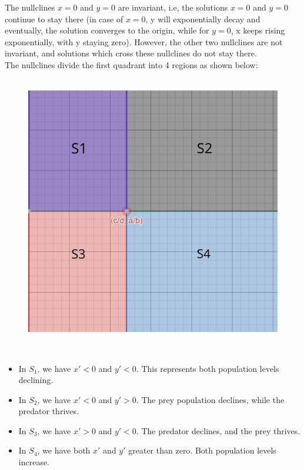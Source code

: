 \documentclass{article}
\begin{document}
The nullclines $x = 0$ and $y = 0$ are invariant, i.e, the solutions $x = 0$ and $y = 0$ continue to stay there (in case of $x = 0$, y will exponentially decay and eventually, the solution converges to the origin, while for $y = 0$, x keeps rising exponentially, with y staying zero). However, the other two nullclines are not invariant, and solutions which cross these nullclines do not stay there.
\\

The nullclines divide the first quadrant into 4 regions as shown below:
\\
\\

\begin{figure}
    \centering
    \includegraphics[scale = 0.7]{nullclines.jpg}
    \caption{}
    \label{}
\end{figure}
\\
\begin{itemize}
    \item In $S_1$, we have $x' < 0$ and $y' < 0$. This represents both population levels declining. 
    \item In $S_2$, we have $x' < 0$ and $y' > 0.$ The prey population declines, while the predator thrives.
    \item In $S_3$, we have $x' > 0$ and $y' < 0$. The predator declines, and the prey thrives.
    \item In $S_4$, we have both $x'$ and $y'$ greater than zero. Both population levels increase.
\end{itemize}
\end{document}
